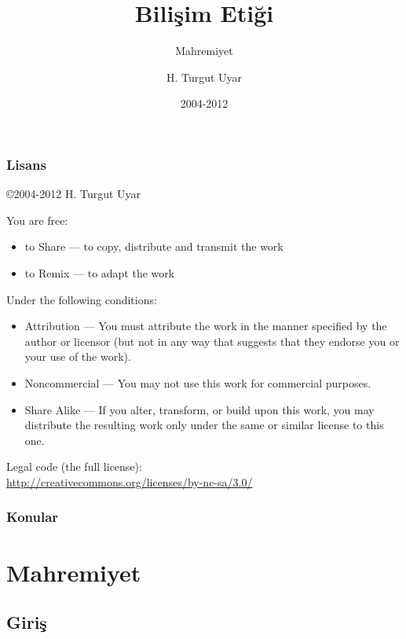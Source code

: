 \documentclass[dvipsnames]{beamer}
\title{Bilişim Etiği}
\subtitle{Mahremiyet}
\author{H. Turgut Uyar}
\date{2004-2012}
\theoremstyle{definition}
\theoremstyle{example}
\theoremstyle{plain}
\begin{document}
\begin{frame}
  \titlepage
\end{frame}

\begin{frame}
  \frametitle{Lisans}

  \hfill
  \copyright 2004-2012 H. Turgut Uyar

  \vfill
  \begin{tiny}
    You are free:
    \begin{itemize}
      \item to Share — to copy, distribute and transmit the work
      \item to Remix — to adapt the work
    \end{itemize}

    Under the following conditions:
    \begin{itemize}
      \item Attribution — You must attribute the work in the manner specified by
        the author or licensor (but not in any way that suggests that they
        endorse you or your use of the work).

      \item Noncommercial — You may not use this work for commercial purposes.

      \item Share Alike — If you alter, transform, or build upon this work, you
        may distribute the resulting work only under the same or similar license
        to this one.
    \end{itemize}
  \end{tiny}

  \vfill
  Legal code (the full license):\\
  \url{http://creativecommons.org/licenses/by-nc-sa/3.0/}
\end{frame}

\begin{frame}
  \frametitle{Konular}
  \tableofcontents
\end{frame}

\section{Mahremiyet}

\subsection{Giriş}
\end{document}
